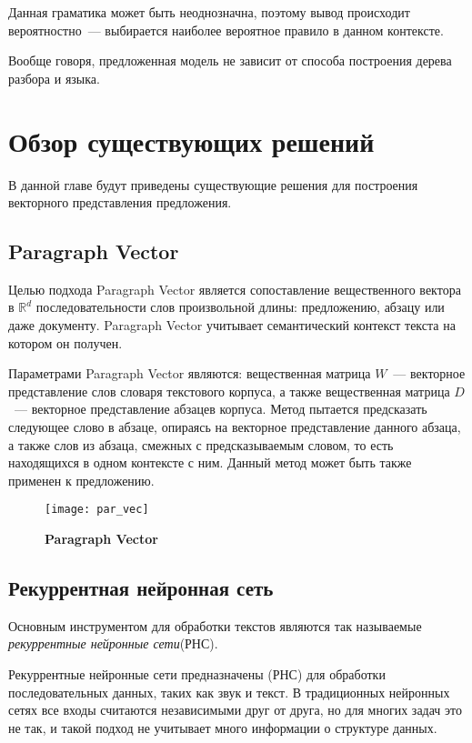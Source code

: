 Данная граматика может быть неоднозначна, 
поэтому вывод происходит вероятностно~--- выбирается наиболее вероятное правило в данном контексте.

Вообще говоря, предложенная модель не зависит от способа построения дерева разбора и языка.

\section{Обзор существующих решений}

В данной главе будут приведены существующие решения для построения векторного представления предложения.

\subsection{Paragraph Vector}
Целью подхода Paragraph Vector является сопоставление вещественного вектора в $\mathbb{R}^d$ последовательности слов произвольной длины: предложению, абзацу или даже документу\cite{DBLP:journals/corr/LeM14}.
Paragraph Vector учитывает семантический контекст текста на котором он получен.

Параметрами Paragraph Vector являются: вещественная матрица $W$~--- векторное представление слов словаря текстового корпуса, а также вещественная матрица $D$~--- векторное представление абзацев корпуса. Метод пытается предсказать следующее слово в абзаце, опираясь на векторное представление данного абзаца, а также слов из абзаца, смежных с предсказываемым словом, то есть находящихся в одном контексте с ним.
Данный метод может быть также применен к предложению.

\begin{figure}[h]
\texttt{[image: par\_vec]}
\caption{\textbf{Paragraph Vector}}
\label{fig:par_vec}
\end{figure}

\subsection{Рекуррентная нейронная сеть}
Основным инструментом для обработки текстов являются так называемые \emph{рекуррентные нейронные сети}(РНС)\cite{Goller96learningtask-dependent}.

Рекуррентные нейронные сети предназначены (РНС) для обработки последовательных данных, таких как звук и текст. В традиционных нейронных сетях все входы считаются независимыми друг от друга, но для многих задач это не так, и такой подход не учитывает много информации о структуре данных.

